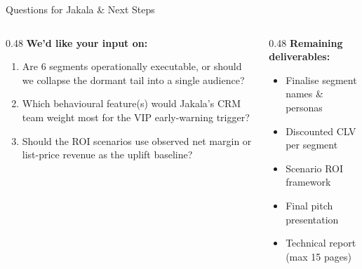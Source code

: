 \documentclass[aspectratio=169,10pt]{beamer}
\begin{document}
\begin{frame}{Questions for Jakala \& Next Steps}
\begin{columns}[T]
  \begin{column}{0.48\textwidth}
    \textbf{We'd like your input on:}
    \begin{enumerate}\small
      \item Are 6 segments operationally executable, or should we
            collapse the dormant tail into a single audience?
      \item Which behavioural feature(s) would Jakala's CRM team weight
            most for the VIP early-warning trigger?
      \item Should the ROI scenarios use observed net margin or list-price
            revenue as the uplift baseline?
    \end{enumerate}
  \end{column}
  \begin{column}{0.48\textwidth}
    \textbf{Remaining deliverables:}
    \begin{itemize}
      \item Finalise segment names \& personas
      \item Discounted CLV per segment
      \item Scenario ROI framework
      \item Final pitch presentation
      \item Technical report (max 15 pages)
    \end{itemize}
  \end{column}
\end{columns}
\vspace{1.0em}
\end{frame}
\end{document}
